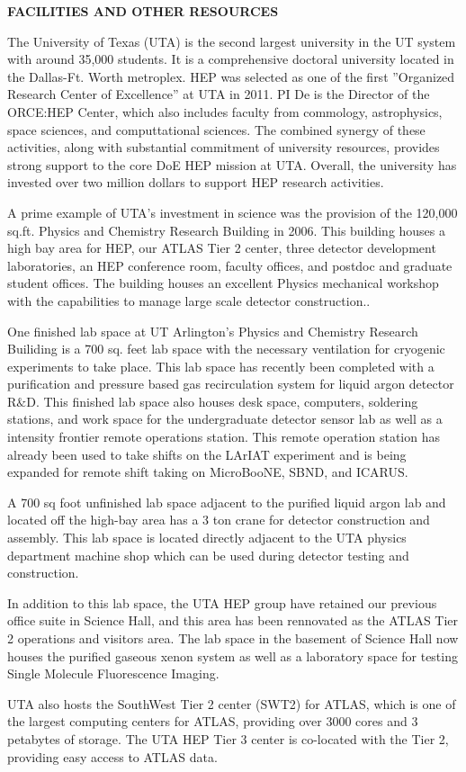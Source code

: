 \begin{center}
\textbf{\LARGE FACILITIES AND OTHER RESOURCES}
\end{center}

The University of Texas (UTA) is the second largest university in the UT system with around 35,000 students. It is a comprehensive doctoral university located in the Dallas-Ft. Worth metroplex. HEP was selected as one of the first ''Organized Research Center of Excellence'' at UTA in 2011. PI De is the Director of the ORCE:HEP Center, which also includes faculty from commology, astrophysics, space sciences, and computtational sciences. The combined synergy of these activities, along with substantial commitment of university resources, provides strong support to the core DoE HEP mission at UTA. Overall, the university has invested over two million dollars to support HEP research activities.

A prime example of UTA's investment in science was the provision of the 120,000 sq.ft. Physics and Chemistry Research Building in 2006.  This building houses a high bay area for HEP, our ATLAS Tier 2 center, three detector development laboratories, an HEP conference room, faculty offices, and postdoc and graduate student offices. The building houses an excellent Physics mechanical workshop with the capabilities to manage large scale detector construction..

One finished lab space at UT Arlington's Physics and Chemistry Research Builiding is a 700 sq. feet lab space with the necessary ventilation for cryogenic experiments to take place. This lab space has recently been completed with a purification and pressure based gas recirculation system for liquid argon detector R$\&$D. This finished lab space also houses desk space, computers, soldering stations, and work space for the undergraduate detector sensor lab as well as a intensity frontier remote operations station. This remote operation station has already been used to take shifts on the LArIAT experiment and is being expanded for remote shift taking on MicroBooNE, SBND, and ICARUS. 

A 700 sq foot unfinished lab space adjacent to the purified liquid argon lab and located off the high-bay area has a 3 ton crane for detector construction and assembly. This lab space is located directly adjacent to the UTA physics department machine shop which can be used during detector testing and construction.

In addition to this lab space, the UTA HEP group have retained our previous office suite in Science Hall, and this area has been rennovated as the ATLAS Tier 2 operations and visitors area. The lab space in the basement of Science Hall now houses the purified gaseous xenon system as well as a laboratory space for testing Single Molecule Fluorescence Imaging.

UTA also hosts the SouthWest Tier 2 center (SWT2) for ATLAS, which is one of the largest computing centers for ATLAS, providing over 3000 cores and 3 petabytes of storage. The UTA HEP Tier 3 center is co-located with the Tier 2, providing easy access to ATLAS data.
